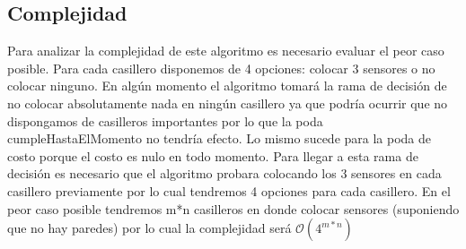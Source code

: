 \subsection{Complejidad}
Para analizar la complejidad de este algoritmo es necesario evaluar el peor caso posible. Para cada casillero disponemos de 4 opciones: colocar 3 sensores o no colocar ninguno. En algún momento el algoritmo tomará la rama de decisión de no colocar absolutamente nada en ningún casillero ya que podría ocurrir que no dispongamos de casilleros importantes por lo que la poda cumpleHastaElMomento no tendría efecto. Lo mismo sucede para la poda de costo porque el costo es nulo en todo momento. Para llegar a esta rama de decisión es necesario que el algoritmo probara colocando los 3 sensores en cada casillero previamente por lo cual tendremos 4 opciones para cada casillero. En el peor caso posible tendremos m*n casilleros en donde colocar sensores (suponiendo que no hay paredes) por lo cual la complejidad será $\mathcal{O}(4^{m*n})$
